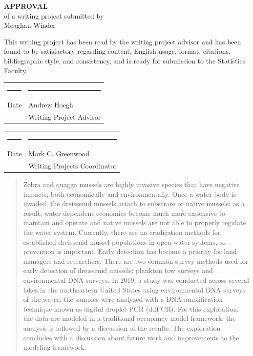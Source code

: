 \documentclass[12pt]{article}\usepackage[]{graphicx}\usepackage[]{color}
\begin{document}
\begin{titlepage}
\null
\begin{center}
{\bf\huge APPROVAL}\\[1.0 in]
of a writing project submitted by\\[.25 in]
Meaghan Winder \\[0.5 in]
\end{center}

\noindent
This writing project has been read by the writing project advisor and
has been found to be satisfactory regarding content, English usage,
format, citations, bibliographic style, and consistency, and is ready
for submission to the Statistics Faculty.

\vspace{.3in}
\begin{center}
\begin{tabular}{ll}
\rule{2.75in}{.03in} & \rule{2.75in}{.03in} \\
Date& Andrew Hoegh \\
& Writing Project Advisor \\
\end{tabular}
\end{center}

\vspace{1cm}

\begin{center}
\begin{tabular}{ll}
\rule{2.75in}{.03in} & \rule{2.75in}{.03in} \\
Date& Mark C. Greenwood \\
& Writing Projects Coordinator \\
\end{tabular}
\end{center}

\end{titlepage}

\newpage
\tableofcontents
\newpage

\begin{abstract}
\noindent Zebra and quagga mussels are highly invasive species that have negative impacts, both economically and environmentally. Once a water body is invaded, the dreissenid mussels attach to substrate or native mussels; as a result, water dependent economies become much more expensive to maintain and operate and native mussels are not able to properly regulate the water system. Currently, there are no eradication methods for established dreissenid mussel populations in open water systems, so prevention is important. Early detection has become a priority for land managers and researchers. There are two common survey methods used for early detection of dreissenid mussels: plankton tow surveys and environmental DNA surveys. In 2019, a study was conducted across several lakes in the northeastern United States using environmental DNA surveys of the water; the samples were analyzed with a DNA amplification technique known as digital droplet PCR (ddPCR). For this exploration, the data are modeled in a traditional occupancy model framework; the analysis is followed by a discussion of the results. The exploration concludes with a discussion about future work and improvements to the modeling framework. 
\end{abstract}
\end{document}
